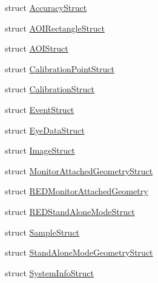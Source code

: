 \begin{DoxyCompactItemize}
\item 
struct \hyperlink{struct_web_analyzer_1_1_eye_tracking_1_1_eye_tracking_controller_1_1_accuracy_struct}{Accuracy\+Struct}
\item 
struct \hyperlink{struct_web_analyzer_1_1_eye_tracking_1_1_eye_tracking_controller_1_1_a_o_i_rectangle_struct}{A\+O\+I\+Rectangle\+Struct}
\item 
struct \hyperlink{struct_web_analyzer_1_1_eye_tracking_1_1_eye_tracking_controller_1_1_a_o_i_struct}{A\+O\+I\+Struct}
\item 
struct \hyperlink{struct_web_analyzer_1_1_eye_tracking_1_1_eye_tracking_controller_1_1_calibration_point_struct}{Calibration\+Point\+Struct}
\item 
struct \hyperlink{struct_web_analyzer_1_1_eye_tracking_1_1_eye_tracking_controller_1_1_calibration_struct}{Calibration\+Struct}
\item 
struct \hyperlink{struct_web_analyzer_1_1_eye_tracking_1_1_eye_tracking_controller_1_1_event_struct}{Event\+Struct}
\item 
struct \hyperlink{struct_web_analyzer_1_1_eye_tracking_1_1_eye_tracking_controller_1_1_eye_data_struct}{Eye\+Data\+Struct}
\item 
struct \hyperlink{struct_web_analyzer_1_1_eye_tracking_1_1_eye_tracking_controller_1_1_image_struct}{Image\+Struct}
\item 
struct \hyperlink{struct_web_analyzer_1_1_eye_tracking_1_1_eye_tracking_controller_1_1_monitor_attached_geometry_struct}{Monitor\+Attached\+Geometry\+Struct}
\item 
struct \hyperlink{struct_web_analyzer_1_1_eye_tracking_1_1_eye_tracking_controller_1_1_r_e_d_monitor_attached_geometry}{R\+E\+D\+Monitor\+Attached\+Geometry}
\item 
struct \hyperlink{struct_web_analyzer_1_1_eye_tracking_1_1_eye_tracking_controller_1_1_r_e_d_stand_alone_mode_struct}{R\+E\+D\+Stand\+Alone\+Mode\+Struct}
\item 
struct \hyperlink{struct_web_analyzer_1_1_eye_tracking_1_1_eye_tracking_controller_1_1_sample_struct}{Sample\+Struct}
\item 
struct \hyperlink{struct_web_analyzer_1_1_eye_tracking_1_1_eye_tracking_controller_1_1_stand_alone_mode_geometry_struct}{Stand\+Alone\+Mode\+Geometry\+Struct}
\item 
struct \hyperlink{struct_web_analyzer_1_1_eye_tracking_1_1_eye_tracking_controller_1_1_system_info_struct}{System\+Info\+Struct}
\end{DoxyCompactItemize}
